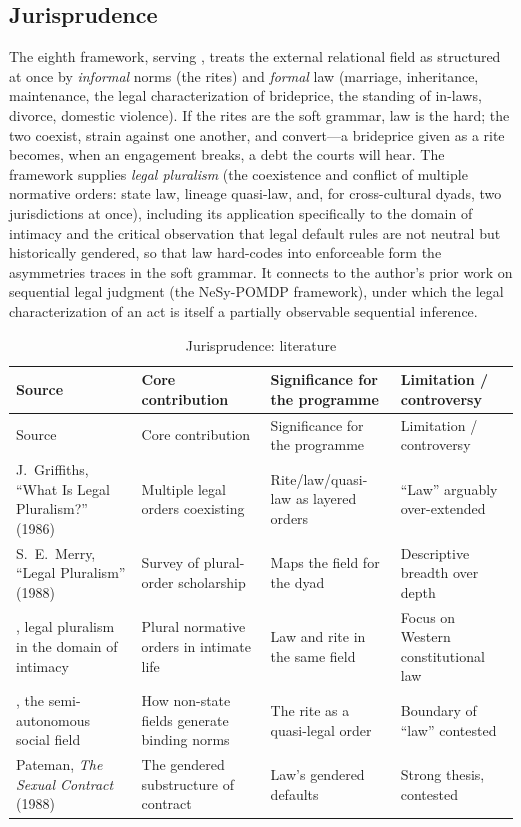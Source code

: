 \subsection{Jurisprudence}
The eighth framework, serving , treats the external relational field as structured at once by \emph{informal} norms (the rites) and \emph{formal} law (marriage, inheritance, maintenance, the legal characterization of brideprice, the standing of in-laws, divorce, domestic violence). If the rites are the soft grammar, law is the hard; the two coexist, strain against one another, and convert---a brideprice given as a rite becomes, when an engagement breaks, a debt the courts will hear. The framework supplies \emph{legal pluralism} \parencite{griffiths1986,merry1988,moore1973semiautonomous} (the coexistence and conflict of multiple normative orders: state law, lineage quasi-law, and, for cross-cultural dyads, two jurisdictions at once), including its application specifically to the domain of intimacy \parencite{cohen2012intimacy} and the critical observation that legal default rules are not neutral but historically gendered, so that law hard-codes into enforceable form the asymmetries  traces in the soft grammar. It connects to the author's prior work on sequential legal judgment (the NeSy-POMDP framework), under which the legal characterization of an act is itself a partially observable sequential inference.

\goldrule
\footnotesize
\begin{longtable}{Y Y Y Y}
\caption{Jurisprudence: literature}\label{p07:tab:lit-juris}\\
\toprule
{}
Source & Core contribution & Significance for the programme & Limitation / controversy \\
\midrule
\endfirsthead
{}
Source & Core contribution & Significance for the programme & Limitation / controversy \\
\midrule
\endhead
J.\ Griffiths, ``What Is Legal Pluralism?'' (1986) & Multiple legal orders coexisting & Rite/law/quasi-law as layered orders & ``Law'' arguably over-extended \\
S.\ E.\ Merry, ``Legal Pluralism'' (1988) & Survey of plural-order scholarship & Maps the field for the dyad & Descriptive breadth over depth \\
\textcite{cohen2012intimacy}, legal pluralism in the domain of intimacy & Plural normative orders in intimate life & Law and rite in the same field & Focus on Western constitutional law \\
\textcite{moore1973semiautonomous}, the semi-autonomous social field & How non-state fields generate binding norms & The rite as a quasi-legal order & Boundary of ``law'' contested \\
Pateman, \emph{The Sexual Contract} (1988) & The gendered substructure of contract & Law's gendered defaults & Strong thesis, contested \\
\bottomrule
\end{longtable}

